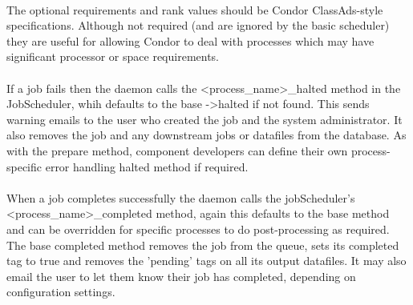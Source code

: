 \paragraph{}
The optional requirements and rank values should be Condor ClassAds-style \citep{raman:98} specifications. Although not required (and are ignored by the basic scheduler) they are useful for allowing Condor to deal with processes which may have significant processor or space requirements. 

\paragraph{}
If a job fails then the daemon calls the <process\_name>\_halted method in the JobScheduler, whih defaults to the base ->halted if not found. This sends warning emails to the user who created the job and the system administrator. It also removes the job and any downstream jobs or datafiles from the database. As with the prepare method, component developers can define their own process-specific error handling halted method if required.

\paragraph{}
When a job completes successfully the daemon calls the jobScheduler's <process\_name>\_completed method, again this defaults to the base method and can be overridden for specific processes to do post-processing as required. The base completed method removes the job from the queue, sets its completed tag to true and removes the 'pending' tags on all its output datafiles. It may also email the user to let them know their job has completed, depending on configuration settings.
